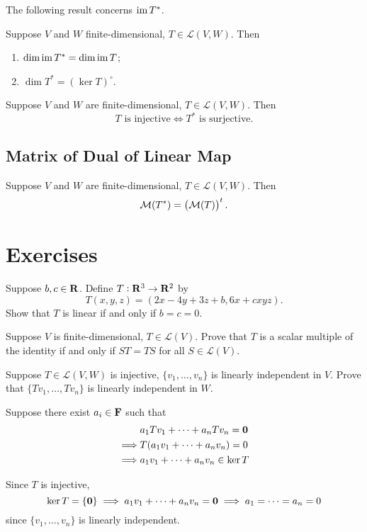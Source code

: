 The following result concerns $\operatorname{im} T^*$.

\begin{proposition}
Suppose $V$ and $W$ finite-dimensional, $T\in\mathcal{L}(V,W)$. Then
\begin{enumerate}[label=(\roman*)]
\item $\dim\operatorname{im} T^*=\dim\operatorname{im} T$;
\item $\dim T^*=(\ker T)^\circ$.
\end{enumerate}
\end{proposition}

\begin{proposition}
Suppose $V$ and $W$ are finite-dimensional, $T\in\mathcal{L}(V,W)$. Then
\[T\text{ is injective}\iff T^*\text{ is surjective.}\]
\end{proposition}

\subsection{Matrix of Dual of Linear Map}
\begin{proposition}
Suppose $V$ and $W$ are finite-dimensional, $T\in\mathcal{L}(V,W)$. Then
\[\mathcal{M}(T^*)=\left(\mathcal{M}(T)\right)^t.\]
\end{proposition}


\pagebreak

\section*{Exercises}
\begin{prbm}
Suppose $b,c\in\mathbf R$. Define $T:\mathbf R^3\to\mathbf R^2$ by
\[T(x,y,z)=(2x-4y+3z+b,6x+cxyz).\]
Show that $T$ is linear if and only if $b=c=0$.
\end{prbm}

\begin{prbm}
Suppose $V$ is finite-dimensional, $T\in\mathcal{L}(V)$. Prove that $T$ is a scalar multiple of the identity if and only if $ST=TS$ for all $S\in\mathcal{L}(V)$.
\end{prbm}

\begin{prbm}
Suppose $T\in\mathcal{L}(V,W)$ is injective, $\{v_1,\dots,v_n\}$ is linearly independent in $V$. Prove that $\{Tv_1,\dots,Tv_n\}$ is linearly independent in $W$.
\end{prbm}

\begin{solution}
Suppose there exist $a_i\in\mathbf F$ such that
\begin{align*}
&a_1Tv_1+\cdots+a_nTv_n=\vb{0}\\
\implies&T(a_1v_1+\cdots+a_nv_n)=0\\
\implies&a_1v_1+\cdots+a_nv_n\in\ker T
\end{align*}

Since $T$ is injective,
\[\ker T=\{\vb{0}\}\implies a_1v_1+\cdots+a_nv_n=\vb{0}\implies a_1=\cdots=a_n=0\]
since $\{v_1,\dots,v_n\}$ is linearly independent.
\end{solution}

